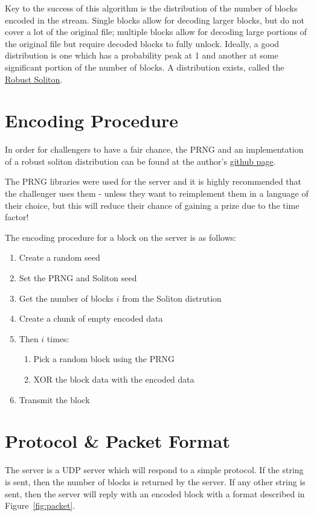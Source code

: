 \documentclass[10pt,a4paper]{article}
\begin{document}
Key to the success of this algorithm is the distribution of the number of blocks encoded in the stream.
Single blocks allow for decoding larger blocks, but do not cover a lot of the original file; multiple blocks allow for decoding large portions of the original file but require decoded blocks to fully unlock.
Ideally, a good distribution is one which has a probability peak at 1 and another at some significant portion of the number of blocks.
A distribution exists, called the \href{http://en.wikipedia.org/wiki/Soliton_distribution}{Robust Soliton}.

\section{Encoding Procedure}

In order for challengers to have a fair chance, the PRNG and an implementation of a robust soliton distribution can be found at the author's \href{http://github.com/carl-ellis/}{github page}.

The PRNG libraries were used for the server and it is highly recommended that the challenger uses them - unless they want to reimplement them in a language of their choice, but this will reduce their chance of gaining a prize due to the time factor!

The encoding procedure for a block on the server is as follows:

\begin{enumerate}
	\item Create a random seed
	\item Set the PRNG and Soliton seed
	\item Get the number of blocks $i$ from the Soliton distrution
	\item Create a chunk of empty encoded data
	\item Then $i$ times:
	\begin{enumerate}
		\item Pick a random block using the PRNG
		\item XOR the block data with the encoded data
	\end{enumerate}
	\item Transmit the block 
\end{enumerate}


\section{Protocol \& Packet Format}

The server is a UDP server which will respond to a simple protocol.
If the string  is sent, then the number of blocks is returned by the server.
If any other string is sent, then the server will reply with an encoded block with a format described in Figure~\ref{fig:packet}.
\end{document}
